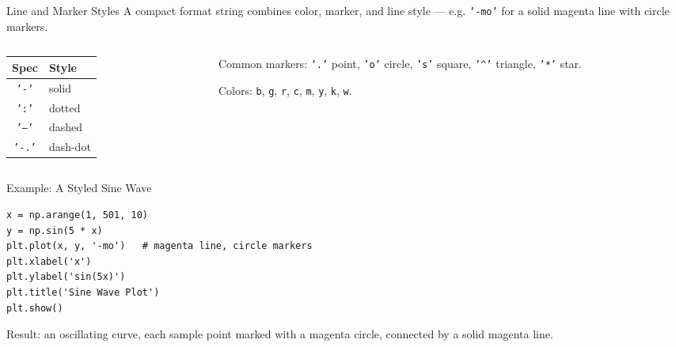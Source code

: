 \documentclass[9pt,aspectratio=169,xcolor=table]{beamer}
\newcommand{\striped}{\rowcolors{1}{white}{stripe}}
\begin{document}
\begin{frame}{Line and Marker Styles}
    \leavevmode
    \small
    A compact format string combines color, marker, and line style ---
    e.g. \texttt{'-mo'} for a solid magenta line with circle markers.

    \vspace{2mm}
    \begin{columns}[t]
        \begin{column}{.5\textwidth}
            \striped
            \begin{center}
            \begin{tabular}{cl}
                \toprule
                \textbf{Spec} & \textbf{Style} \\
                \midrule
                \texttt{'-'}  & solid \\
                \texttt{':'}  & dotted \\
                \texttt{'--'} & dashed \\
                \texttt{'-.'} & dash-dot \\
                \bottomrule
            \end{tabular}
            \end{center}
        \end{column}
        \begin{column}{.5\textwidth}
            \small Common markers: \texttt{'.'} point, \texttt{'o'}
            circle, \texttt{'s'} square, \texttt{'\^{}'} triangle,
            \texttt{'*'} star.

            \vspace{2mm}
            Colors: \texttt{b}, \texttt{g}, \texttt{r}, \texttt{c},
            \texttt{m}, \texttt{y}, \texttt{k}, \texttt{w}.
        \end{column}
    \end{columns}
\end{frame}

\begin{frame}[fragile]{Example: A Styled Sine Wave}
    \leavevmode
\begin{lstlisting}
x = np.arange(1, 501, 10)
y = np.sin(5 * x)
plt.plot(x, y, '-mo')   # magenta line, circle markers
plt.xlabel('x')
plt.ylabel('sin(5x)')
plt.title('Sine Wave Plot')
plt.show()
\end{lstlisting}

    \vspace{2mm}
    {\small Result: an oscillating curve, each sample point marked with
    a magenta circle, connected by a solid magenta line.}
\end{frame}
\end{document}
